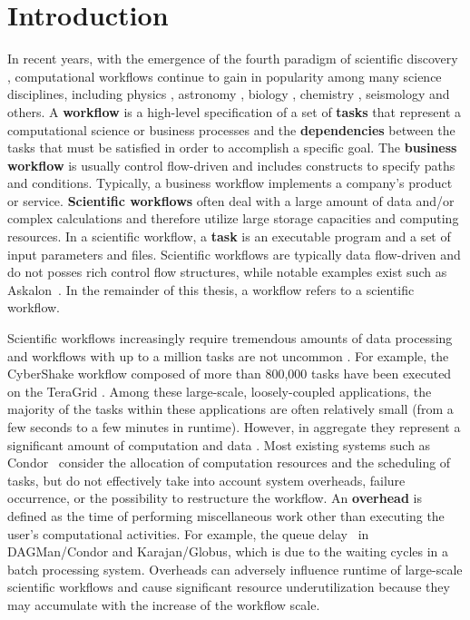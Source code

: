 \chapter{Introduction}


In recent years, with the emergence of the fourth paradigm of scientific discovery \cite{Hey2009}, computational workflows continue to gain in popularity among many science disciplines, including physics \cite{Deelman2002}, astronomy \cite{Sakellariou2010}, biology \cite{Lathers2006, Oinn2004}, chemistry \cite{Wieczorek2005}, seismology \cite{Maechling2007} and others. 
A \textbf{workflow} is a high-level specification of a set of \textbf{tasks} that represent a computational science or business processes and the \textbf{dependencies} between the tasks that must be satisfied in order to accomplish a specific goal. The \textbf{business workflow} is usually control flow-driven and includes constructs to specify paths and conditions. Typically, a business workflow implements a company’s product or service. \textbf{Scientific workflows} often deal with a large amount of data and/or complex calculations and therefore utilize large storage capacities and computing resources. In a scientific workflow, a \textbf{task} is an executable program and a set of input parameters and files. Scientific workflows are typically data flow-driven and do not posses rich control flow structures, while notable examples exist such as Askalon~\cite{Ostermann2009b}. In the remainder of this thesis, a workflow refers to a scientific workflow. 


Scientific workflows increasingly require tremendous amounts of data processing and workflows with up to a million tasks are not uncommon \cite{Callaghan2011}. For example, the CyberShake workflow \cite{Rynge2012} composed of more than 800,000 tasks have been executed on the TeraGrid \cite{TeraGrid}. Among these large-scale, loosely-coupled applications, the majority of the tasks within these applications are often relatively small (from a few seconds to a few minutes in runtime). However, in aggregate they represent a significant amount of computation and data \cite{Deelman2002}. Most existing systems such as Condor~\cite{Kalayci2010} consider the allocation of computation resources and the scheduling of tasks, but do not effectively take into account system overheads, failure occurrence, or the possibility to restructure the workflow. 
An \textbf{overhead} is defined as the time of performing miscellaneous work other than executing the user's computational activities. For example, the queue delay~\cite{Stratan2008} in DAGMan/Condor and Karajan/Globus, which is due to the waiting cycles in a batch processing system. Overheads can adversely influence runtime of large-scale scientific workflows and cause significant resource underutilization \cite{Chen2011} because they may accumulate with the increase of the workflow scale. 

